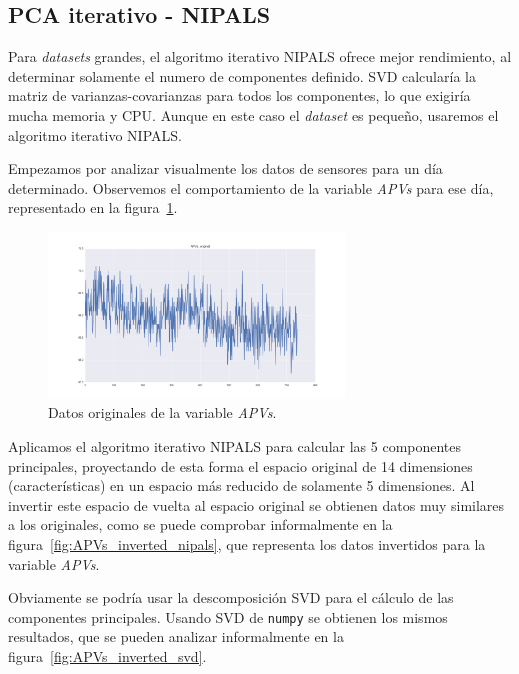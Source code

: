 \documentclass[11pt,spanish,listoffigures,listoftables]{tfgetsinf}
\begin{document}
    \subsection{PCA iterativo - NIPALS}
    Para {\em datasets} grandes, el algoritmo iterativo NIPALS ofrece mejor rendimiento, al determinar solamente el numero de componentes definido. SVD calcularía la matriz de varianzas-covarianzas para todos los componentes, lo que exigiría mucha memoria y CPU. Aunque en este caso el {\em dataset} es pequeño, usaremos el algoritmo iterativo NIPALS.
    
    Empezamos por analizar visualmente los datos de sensores para un día determinado. Observemos el comportamiento de la variable {\em APVs} para ese día, representado en la figura~\ref{fig:APVs_original}. 
    
    \begin{figure}[h]
        \centering
        \includegraphics[width=0.7\textwidth]{APVs_original.png}
        \caption{Datos originales de la variable {\em APVs}.}
        \label{fig:APVs_original}
    \end{figure}
    
    Aplicamos el algoritmo iterativo NIPALS para calcular las 5 componentes principales, proyectando de esta forma el espacio original de 14 dimensiones (características) en un espacio más reducido de solamente 5 dimensiones. Al invertir este espacio de vuelta al espacio original se obtienen datos muy similares a los originales, como se puede comprobar informalmente en la figura~\ref{fig:APVs_inverted_nipals}, que representa los datos invertidos para la variable {\em APVs}.
    
    Obviamente se podría usar la descomposición SVD para el cálculo de las componentes principales. Usando SVD de {\tt numpy} se obtienen los mismos resultados, que se pueden analizar informalmente en la figura~\ref{fig:APVs_inverted_svd}. 
    
\end{document}
